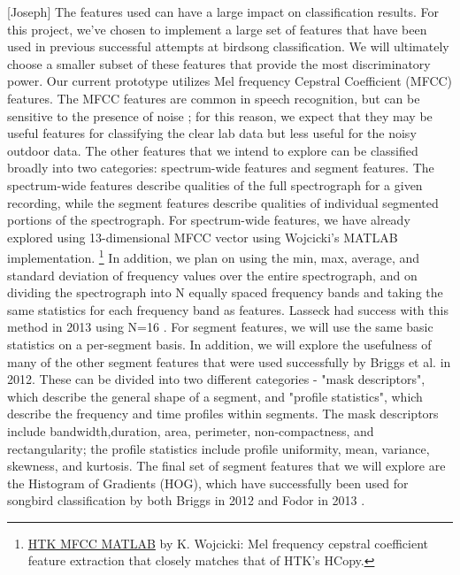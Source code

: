 \documentclass{article} %
\begin{document}
[Joseph]  The features used can have a large impact on classification results. For this project, we've chosen to implement a
large set of features that have been used in previous successful attempts at birdsong classification. We will ultimately
choose a smaller subset of these features that provide the most discriminatory power. 
  Our current prototype utilizes Mel frequency Cepstral Coefficient (MFCC) features. The MFCC features are common in
speech recognition, but can be sensitive to the presence of noise \cite{tyagi2005desensitizing}; for this reason, we expect that they may be
useful features for classifying the clear lab data but less useful for the noisy outdoor data. 
  The other features that we intend to explore can be classified broadly into two categories: spectrum-wide features and
segment features. The spectrum-wide features describe qualities of the full spectrograph for a given recording, while
the segment features describe qualities of individual segmented portions of the spectrograph.
  For spectrum-wide features, we have already explored using 13-dimensional MFCC vector using Wojcicki's MATLAB
implementation. \footnote{\scriptsize \href{http://www.mathworks.com/matlabcentral/fileexchange/32849-htk-mfcc-matlab/content/mfcc/mfcc.m}{HTK MFCC MATLAB} by K. Wojcicki: Mel frequency cepstral coefficient feature extraction that closely matches that of HTK's HCopy.} In addition, we plan on using the min, max, average, and standard deviation of frequency values over
the entire spectrograph, and on dividing the spectrograph into N equally spaced frequency bands and taking the same
statistics for each frequency band as features. Lasseck had success with this method in 2013 using N=16 \cite{Lasseck13}.
  For segment features, we will use the same basic statistics on a per-segment basis. In addition, we will explore the
usefulness of many of the other segment features that were used successfully by Briggs et al. in 2012. These can be divided 
into two different categories - "mask descriptors", which describe the general shape of a segment, and "profile statistics", 
which describe the frequency and time profiles within segments. The mask descriptors include bandwidth,duration, area, 
perimeter, non-compactness, and rectangularity; the profile statistics include profile uniformity, mean, variance,
skewness, and kurtosis. The final set of segment features that we will explore are the Histogram of Gradients (HOG), 
which have successfully been used for songbird classification by both Briggs in 2012 \cite{mlsp1} and Fodor in 2013 \cite{fodor2013ninth}. 
\end{document}
